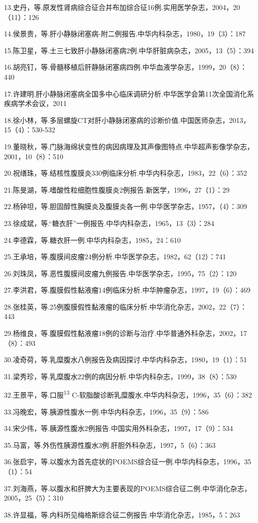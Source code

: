 13.史丹，等.原发性肾病综合征合并布加综合征16例.实用医学杂志，2004，20（11）：126

14.侯景贵，等.肝小静脉闭塞病-附二例报告.中华内科杂志，1980，19（3）：187

15.陈卫星，等.土三七致肝小静脉闭塞病2例.中华肝脏病杂志，2005，13（5）：394

16.胡亮钉，等.骨髓移植后肝静脉闭塞病四例.中华血液学杂志，1999，20（8）：440

17.许建明.肝小静脉闭塞病全国多中心临床调研分析.中华医学会第11次全国消化系疾病学术会议，2011

18.徐小林，等.多层螺旋CT对肝小静脉闭塞病的诊断价值.中国医师杂志，2013，15（4）：530-532

19.董晓秋，等.门脉海绵状变性的病因病理及其声像图特点.中华超声影像学杂志，2001，10（8）：510

20.祝缮珠，等.结核性腹膜炎330例临床分析.中华内科杂志，1983，22（6）：352

21.陈旻湖，等.嗜酸性粒细胞性腹膜炎2例报告.新医学，1996，27（1）：29

22.杨钟坦，等.胆固醇性胸膜炎及腹膜炎各一例.中华医学杂志，1957，（4）：309

23.徐成斌，等.“糖衣肝”一例报告.中华内科杂志，1965，13（3）：284

24.李德霖，等.糖衣肝一例.中华内科杂志，1985，24：610

25.王承培，等.腹膜间皮瘤24例分析.中华医学杂志，1982，62（12）：741

26.刘珠凤，等.恶性腹膜间皮瘤九例报告.中华医学杂志，1995，75（2）：120

27.李洪君，等.腹膜假性黏液瘤14例临床分析.中华肿瘤杂志，1997，19（6）：469

28.张桂英，等.25例腹膜假性黏液瘤的临床分析.中华消化杂志，2002，22（7）：443

29.杨维良，等.腹膜假性黏液瘤18例的诊断与治疗.中华普通外科杂志，2002，17（8）：493

30.凌奇荷，等.乳糜腹水八例报告及病因探讨.中华内科杂志，1980，19（1）：51

31.梁秀珍，等.乳糜腹水22例的病因分析.中华内科杂志，1999，38（8）：530

32.王景平，等.口服\textsuperscript{13}
C-软脂酸诊断乳糜腹水.中华内科杂志，1996，35（6）：382

33.冯晚宏，等.胰源性腹水一例.中华内科杂志，1996，35（9）：586

34.宋少伟，等.胰源性腹水2例报告.中国实用外科杂志，1997，17（9）：534

35.马富，等.外伤性胰源性腹水3例.肝胆外科杂志，1997，5（6）：363

36.张启宇，等.以腹水为首先症状的POEMS综合征一例.中华内科杂志，1996，35（1）：54

37.刘海燕，等.以腹水和肝脾大为主要表现的POEMS综合征二例.中华消化杂志，2005，25（5）：310

38.许显福，等.内科所见梅格斯综合征二例报告.中华消化杂志，1985，5：263

\protect\hypertarget{text00228.html}{}{}

